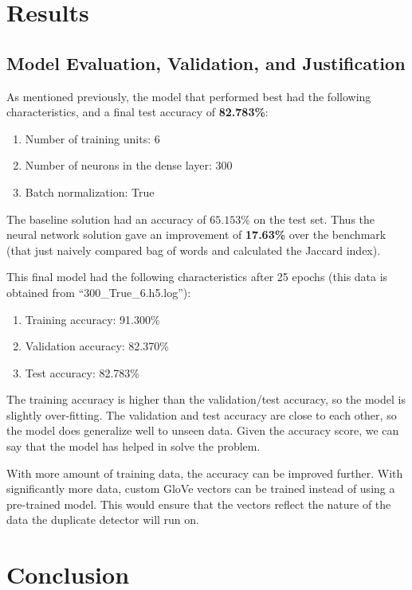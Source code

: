 \documentclass{article}
\begin{document}
\section{Results}
\subsection{Model Evaluation, Validation, and Justification}

As mentioned previously, the model that performed best had the following characteristics, and a final test accuracy of \textbf{82.783\%}:

\begin{enumerate}
\item{Number of training units: 6}
\item{Number of neurons in the dense layer: 300}
\item{Batch normalization: True}
\end{enumerate}

The baseline solution had an accuracy of $65.153\%$ on the test set. Thus the neural network solution gave an improvement of \textbf{17.63\%} over the benchmark (that just naively compared bag of words and calculated the Jaccard index).

This final model had the following characteristics after 25 epochs (this data is obtained from ``300\_True\_6.h5.log''):

\begin{enumerate}
\item{Training accuracy: 91.300\%}
\item{Validation accuracy: 82.370\%}
\item{Test accuracy: 82.783\%}
\end{enumerate}

The training accuracy is higher than the validation/test accuracy, so the model is slightly over-fitting. The validation and test accuracy are close to each other, so the model does generalize well to unseen data. Given the accuracy score, we can say that the model has helped in solve the problem.

With more amount of training data, the accuracy can be improved further. With significantly more data, custom GloVe vectors can be trained instead of using a pre-trained model. This would ensure that the vectors reflect the nature of the data the duplicate detector will run on.

\section{Conclusion}
\end{document}
